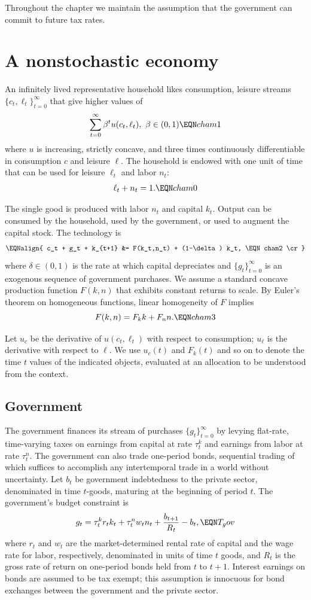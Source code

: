 Throughout the chapter we maintain the assumption that the
government can commit to future tax rates.

\section{A nonstochastic economy}

An infinitely lived  representative household
 likes consumption, leisure streams $\{c_t, \ell_t\}_{t=0}^\infty$
that give higher values of
$$ \sum_{t=0}^\infty \beta^t u(c_t, \ell_t), \ \beta \in (0,1) \EQN cham1 $$
where $u$ is  increasing, strictly concave, and
three times  continuously differentiable in consumption  $c$ and leisure $\ell$.
The household is endowed with one unit of time that can be used for leisure
$\ell_t$ and labor $n_t$:
$$
\ell_t+n_t=1.                                                  \EQN cham0
$$

The single good is produced with labor $n_t$ and capital $k_t$.
Output can be consumed by the household, used by the government, or used
to augment the capital stock. The technology is
$$\EQNalign{ c_t + g_t + k_{t+1} &= F(k_t,n_t) + (1-\delta) k_t, \EQN cham2
                                                                        \cr}$$
where $\delta \in (0,1)$ is the rate at which capital depreciates and
$\{g_t\}_{t=0}^\infty$ is an exogenous sequence of government
purchases.
We assume a standard concave production function
$F(k,n)$ that exhibits constant returns to scale. By
Euler's theorem on homogeneous functions,  linear homogeneity of $F$   implies
$$ F(k,n) = F_k k + F_n n. \EQN cham3 $$

Let $u_c$   be the
derivative of $u(c_t, \ell_t)$ with respect to consumption;
$u_\ell$ is the derivative with
respect to $\ell$.
 We use $u_c(t)$ and $F_k(t)$ and so on
to denote the time $t$ values of the indicated objects,
evaluated at an allocation to be understood from the
context.


\subsection{Government}

The government finances its stream of purchases
$\{g_t\}_{t=0}^\infty$ by levying
flat-rate, time-varying taxes on earnings from  capital  at
rate $\tau^k_{t}$ and earnings from labor at rate $\tau^n_{t}$.
The government can also trade one-period bonds, sequential
trading of which
suffices to accomplish any intertemporal
trade in a world without uncertainty. Let $b_t$ be government
indebtedness to the private sector, denominated in time $t$-goods,
maturing at the beginning of period $t$. The government's
budget constraint is
$$ g_t =  \tau^k_t r_t k_t + \tau^n_t w_t n_t + {b_{t+1} \over R_t} - b_t ,
                                                              \EQN T_gov $$
where $r_t$ and $w_t$ are the market-determined rental rate of capital
and the wage rate for labor, respectively, denominated
in units of time $t$ goods,  and  $R_t$ is the gross rate
of return on one-period bonds held from $t$ to $t+1$. Interest earnings
on bonds are assumed to be tax exempt; this assumption is innocuous
for bond exchanges  between the government and the private sector.


